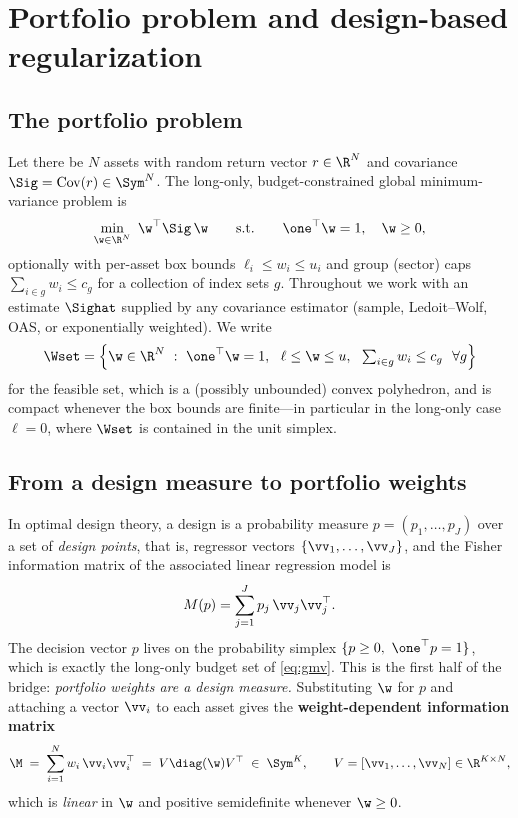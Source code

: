 \section{Portfolio problem and design-based regularization}
\label{sec:setup}

\subsection{The portfolio problem}
Let there be $N$ assets with random return vector $r\in\R^{N}$ and covariance
$\Sig=\operatorname{Cov}(r)\in\Sym^{N}$. The long-only, budget-constrained global
minimum-variance problem is
\begin{equation}
  \min_{\w\in\R^{N}}\ \w^\top\Sig\,\w
  \qquad\text{s.t.}\qquad \one^\top\w=1,\quad \w\ge0,
  \label{eq:gmv}
\end{equation}
optionally with per-asset box bounds $\ell_i\le w_i\le u_i$ and group (sector)
caps $\sum_{i\in g}w_i\le c_g$ for a collection of index sets $g$. Throughout we
work with an estimate $\Sighat$ supplied by any covariance estimator (sample,
Ledoit--Wolf, OAS, or exponentially weighted). We write
\begin{equation}
  \Wset=\Big\{\w\in\R^{N}\ :\ \one^\top\w=1,\ \ \ell\le\w\le u,\ \
  \textstyle\sum_{i\in g}w_i\le c_g\ \ \forall g\Big\}
  \label{eq:feasible}
\end{equation}
for the feasible set, which is a (possibly unbounded) convex polyhedron, and is
compact whenever the box bounds are finite---in particular in the long-only case
$\ell=0$, where $\Wset$ is contained in the unit simplex.

\subsection{From a design measure to portfolio weights}
In optimal design theory, a design is a probability measure
$p=(p_1,\dots,p_J)$ over a set of \emph{design points}, that is, regressor vectors
$\{\vv_1,\dots,\vv_J\}$, and the Fisher information matrix of the associated
linear regression model is
\begin{equation}
  M(p)=\sum_{j=1}^{J}p_j\,\vv_j\vv_j^\top .
  \label{eq:designinfo}
\end{equation}
The decision vector $p$ lives on the probability simplex
$\{p\ge0,\ \one^\top p=1\}$, which is exactly the long-only budget set of
\eqref{eq:gmv}. This is the first half of the bridge: \emph{portfolio weights are
a design measure.} Substituting $\w$ for $p$ and attaching a vector $\vv_i$ to
each asset gives the \textbf{weight-dependent information matrix}
\begin{equation}
  \M \;=\; \sum_{i=1}^{N} w_i\,\vv_i\vv_i^\top \;=\; V\diag(\w)V^\top
  \;\in\;\Sym^{K},
  \qquad V=[\vv_1,\dots,\vv_N]\in\R^{K\times N},
  \label{eq:infomat}
\end{equation}
which is \emph{linear} in $\w$ and positive semidefinite whenever $\w\ge0$.

